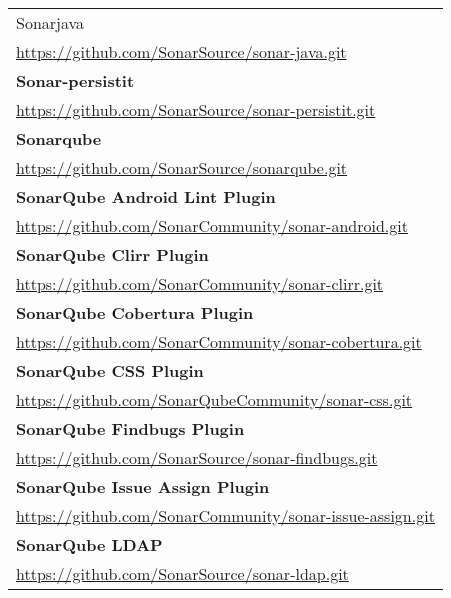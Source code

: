\begin{table}[]
\begin{tabular}{|p{130mm}|}
Sonarjava                                          \\ \url{https://github.com/SonarSource/sonar-java.git}                                \\ \hline \bf
Sonar-persistit                                    \\ \url{https://github.com/SonarSource/sonar-persistit.git}                           \\ \hline \bf
Sonarqube                                          \\ \url{https://github.com/SonarSource/sonarqube.git}                                 \\ \hline \bf
SonarQube Android Lint Plugin                      \\ \url{https://github.com/SonarCommunity/sonar-android.git}                          \\ \hline \bf 
SonarQube Clirr Plugin                             \\ \url{https://github.com/SonarCommunity/sonar-clirr.git}                            \\ \hline \bf
SonarQube Cobertura Plugin                         \\ \url{https://github.com/SonarCommunity/sonar-cobertura.git}                        \\ \hline \bf
SonarQube CSS Plugin                               \\ \url{https://github.com/SonarQubeCommunity/sonar-css.git}                          \\ \hline \bf
SonarQube Findbugs Plugin                          \\ \url{https://github.com/SonarSource/sonar-findbugs.git}                            \\ \hline \bf
SonarQube Issue Assign Plugin                      \\ \url{https://github.com/SonarCommunity/sonar-issue-assign.git}                     \\ \hline \bf
SonarQube LDAP                                     \\ \url{https://github.com/SonarSource/sonar-ldap.git}                                \\ \hline 

\end{tabular}
\end{table}

